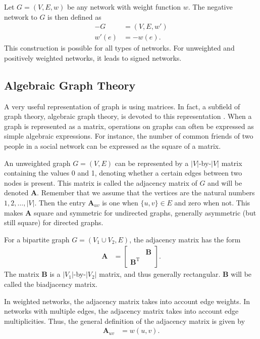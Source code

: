 \documentclass{article}
\begin{document}
Let $G=(V,E,w)$ be any network with weight function $w$.  The negative
network to $G$ is then defined as
\begin{align}
  -G &= (V, E, w') \\
  w'(e) &= -w(e). \nonumber
\end{align}
This construction is possible for all types of networks. For unweighted
and positively weighted networks, it leads to signed networks. 

\subsection{Algebraic Graph Theory}
A very useful representation of graph is using matrices. In fact, a
subfield of graph theory, algebraic graph theory, is devoted to
this representation \citep{b118}.  When a graph is represented as a
matrix, operations on graphs can often be expressed as simple algebraic
expressions.  For instance, the number of common friends of
two people in a social network can be expressed as the square of a
matrix. 

An unweighted graph $G=(V,E)$ can be represented by a $|V|$-by-$|V|$
matrix containing the values 0 and 1, denoting whether a certain edges
between two nodes is present.  This matrix is called the adjacency
matrix of $G$ and will be denoted $\mathbf A$.  Remember that we assume
that the vertices are the natural numbers $1, 2, \dotsc, |V|$.  Then the
entry $\mathbf A_{uv}$ is one when $\{u,v\} \in E$ and zero when not.
This makes $\mathbf A$ square and symmetric for undirected graphs, generally
asymmetric (but still square) for directed graphs.  

For a bipartite graph $G=(V_1 \cup V_2, E)$, the adjacency matrix has
the form 
\begin{align}
  \mathbf A &= \left[ \begin{array}{cc} & \mathbf B \\
      \mathbf B^{\mathrm T} & \end{array} \right].
\end{align}
The matrix $\mathbf B$ is a $|V_1|$-by-$|V_2|$ matrix, and thus
generally rectangular. $\mathbf B$ will be called the biadjacency
matrix. 

In weighted networks, the adjacency matrix takes into account edge
weights.  In networks with multiple edges, the adjacency matrix takes
into account edge multiplicities. Thus, the general definition of the
adjacency matrix is given by
\begin{align}
  \mathbf A_{uv} &= w(u, v). 
\end{align}
\end{document}
